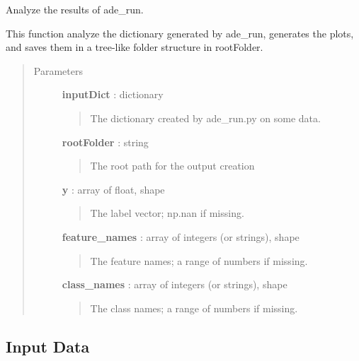 \documentclass[letterpaper,10pt,english]{sphinxmanual}
\begin{document}

\begin{fulllineitems}
\label{index:adenine.core.analyze_results.start}
Analyze the results of ade\_run.

This function analyze the dictionary generated by ade\_run, generates the plots, and saves them in a tree-like folder structure in rootFolder.
\begin{quote}\begin{description}
\item[{Parameters}] \leavevmode
\textbf{inputDict} : dictionary
\begin{quote}

The dictionary created by ade\_run.py on some data.
\end{quote}

\textbf{rootFolder} : string
\begin{quote}

The root path for the output creation
\end{quote}

\textbf{y} : array of float, shape
\begin{quote}

The label vector; np.nan if missing.
\end{quote}

\textbf{feature\_names} : array of integers (or strings), shape
\begin{quote}

The feature names; a range of numbers if missing.
\end{quote}

\textbf{class\_names} : array of integers (or strings), shape
\begin{quote}

The class names; a range of numbers if missing.
\end{quote}

\end{description}\end{quote}

\end{fulllineitems}



\subsection{Input Data}
\label{index:input-data}\label{index:module-adenine.utils.data_source}
\end{document}

